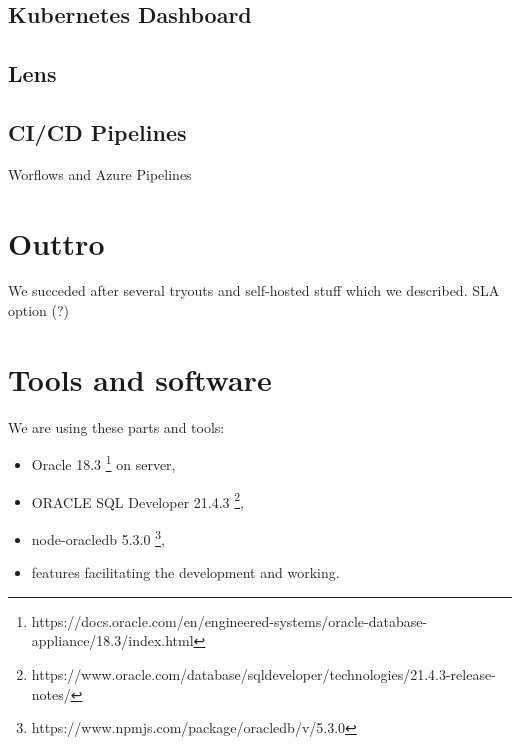\documentclass{article}
\begin{document}
\subsection{Kubernetes Dashboard}
\subsection{Lens}
\subsection{CI/CD Pipelines}
Worflows and Azure Pipelines
\section{Outtro}
We succeded after several tryouts and self-hosted stuff which we described.
SLA option (?)
\section{Tools and software}

We are using these parts and tools:
\begin{itemize}
\item Oracle 18.3 \footnote{https://docs.oracle.com/en/engineered-systems/oracle-database-appliance/18.3/index.html} on server,
\item ORACLE SQL Developer 21.4.3 \footnote{https://www.oracle.com/database/sqldeveloper/technologies/21.4.3-release-notes/},
\item node-oracledb 5.3.0 \footnote{https://www.npmjs.com/package/oracledb/v/5.3.0},
\item features facilitating the development and working.
\end{itemize}

\newpage
\end{document}
